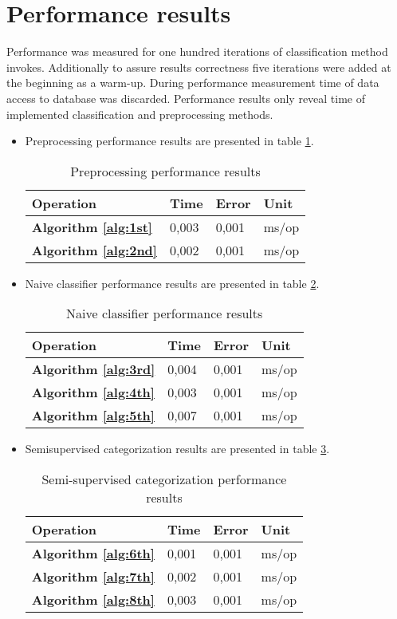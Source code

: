 \section{Performance results}
Performance was measured for one hundred iterations of classification method invokes. Additionally to assure results correctness five iterations were added at the beginning as a warm-up. During performance measurement time of data access to database was discarded. Performance results only reveal time of implemented classification and preprocessing methods.
\begin{itemize}
	\item Preprocessing performance results are presented in table \ref{tabPreprocessing}. 
	\begin{table}[H]
	\begin{tabular}{ | l | l | l | l |}
		\hline
		Operation & Time & Error & Unit\\ \hline		
		\textbf{Algorithm \ref{alg:1st}} & 0,003 & 0,001 & ms/op \\
		\textbf{Algorithm \ref{alg:2nd}} & 0,002 & 0,001 & ms/op \\		
		\hline
	\end{tabular}
	\caption{Preprocessing performance results}
	\label{tabPreprocessing}
	\end{table}
	\item Naive classifier performance results are presented in table \ref{tabNaive}.
	\begin{table}[H]
	\begin{tabular}{ | l | l | l | l |}
		\hline
		Operation & Time & Error & Unit\\ \hline		
		\textbf{Algorithm \ref{alg:3rd}} & 0,004 &  0,001 & ms/op \\
		\textbf{Algorithm \ref{alg:4th}} & 0,003 &  0,001 & ms/op \\
		\textbf{Algorithm \ref{alg:5th}} & 0,007 &  0,001 & ms/op \\
		\hline
	\end{tabular}
	\caption{Naive classifier performance results}
	\label{tabNaive}
\end{table}
	\item Semisupervised categorization results are presented in table \ref{tabSemi}.
		\begin{table}[H]
			\begin{tabular}{ | l | l | l | l |}
				\hline
				Operation & Time & Error & Unit\\ \hline		
				\textbf{Algorithm \ref{alg:6th}} & 0,001 &  0,001 & ms/op \\
				\textbf{Algorithm \ref{alg:7th}} & 0,002 &  0,001 & ms/op \\
				\textbf{Algorithm \ref{alg:8th}} & 0,003 &  0,001 & ms/op \\
					\hline
				\end{tabular}
				\caption{Semi-supervised categorization performance results}
				\label{tabSemi}
			\end{table}
\end{itemize}
